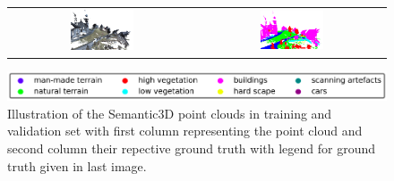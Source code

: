 \begin{figure}
\begin{tabular}{cc}
        \includegraphics[width=0.35\textwidth, height=0.15\textheight]{images/sem3d_data/5.pdf} & 
        \includegraphics[width=0.35\textwidth, height=0.15\textheight]{images/sem3d_data/5_gt.pdf}\\
    \end{tabular}
    \includegraphics[scale=0.45]{images/legend.png}
    \caption{Illustration of the Semantic3D point clouds in training and validation set with first column representing the point cloud 
    and second column their repective ground truth with legend for ground truth given in last image.}
    \label{fig:sem3d_gt_vis}
\end{figure}

